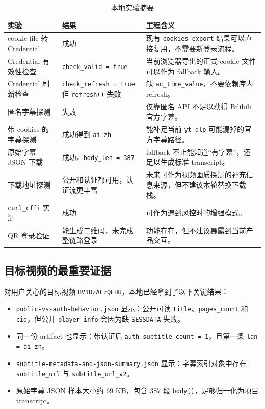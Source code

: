 \documentclass[a4paper]{article}
\begin{document}
\begin{table}[H]
\centering
\begin{tabularx}{\textwidth}{p{3.4cm}p{2.2cm}Y}
\toprule
实验 & 结果 & 工程含义 \\
\midrule
cookie file 转 Credential & 成功 & 现有 \texttt{cookies-export} 结果可以直接复用，不需要新登录流程。 \\
Credential 有效性检查 & \texttt{check\_valid = true} & 当前浏览器导出的正式 cookie 文件可以作为 fallback 输入。 \\
Credential 刷新检查 & \texttt{check\_refresh = true} 但 \texttt{refresh()} 失败 & 缺 \texttt{ac\_time\_value}，不要依赖库内 refresh。 \\
匿名字幕探测 & 失败 & 仅靠匿名 API 不足以获得 Bilibili 官方字幕。 \\
带 cookies 的字幕探测 & 成功得到 \texttt{ai-zh} & 能补足当前 \texttt{yt-dlp} 可能漏掉的官方字幕路径。 \\
原始字幕 JSON 下载 & 成功，\texttt{body\_len = 387} & fallback 不止能知道“有字幕”，还足以生成标准 transcript。 \\
下载地址探测 & 公开和认证都可用，认证流更丰富 & 未来可作为视频画质探测的补充信息来源，但不建议本轮替换下载栈。 \\
\texttt{curl\_cffi} 实测 & 成功 & 可作为遇到风控时的增强模式。 \\
QR 登录验证 & 能生成二维码，未完成整链路登录 & 功能存在，但不建议暴露到当前产品交互。 \\
\bottomrule
\end{tabularx}
\caption{本地实验摘要}
\end{table}

\subsection{目标视频的最重要证据}

对用户关心的目标视频 \texttt{BV1DzALzQEHU}，本地已经拿到了以下关键结果：
\begin{itemize}
\item \texttt{public-vs-auth-behavior.json} 显示：公开可读 \texttt{title}、\texttt{pages\_count} 和 \texttt{cid}，但公开 \texttt{player\_info} 会因为缺 \texttt{SESSDATA} 失败。
\item 同一份 artifact 也显示：带认证后 \texttt{auth\_subtitle\_count = 1}，且第一条 \texttt{lan = ai-zh}。
\item \texttt{subtitle-metadata-and-json-summary.json} 显示：字幕索引对象中存在 \texttt{subtitle\_url} 与 \texttt{subtitle\_url\_v2}。
\item 原始字幕 JSON 样本大小约 69 KB，包含 387 段 \texttt{body[]}，足够归一化为项目 transcript。
\end{itemize}
\end{document}

